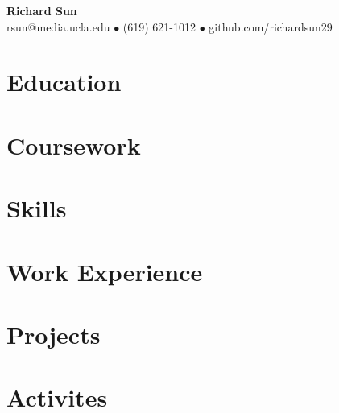 \documentclass{article}
\begin{document}
  \begin{center}
    \Huge \textbf{Richard Sun}\\[1ex]
    \large
    rsun@media.ucla.edu $\bullet$
    (619) 621-1012 $\bullet$
    github.com/richardsun29
  \end{center}


  \section*{Education}

  \section*{Coursework}

  \section*{Skills}

  \section*{Work Experience}

  \section*{Projects}

  \section*{Activites}
\end{document}
